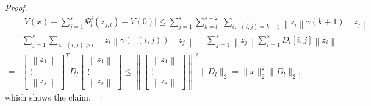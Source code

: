 \documentclass[10pt,a4paper]{amsart}
\DeclareMathOperator{\distG}{\operatorname{dist_\mathcal{G}}} %
\newcommand{\norm}[1]{\left\lVert {#1} \right\rVert}
\begin{document}
\begin{proof}
    \begin{align*}
         & \Bigg| {V(x) - \sum_{j=1}^s \Psi_l^j(z_{j,l}) - V(0)} \Bigg|  \leq \sum_{j=1}^s \sum_{k = l}^{s-2} \; \sum_{i: \distG(i,j) = k+1} \norm{z_i} \gamma(k+1) \norm{z_j} \\ 
         = &  \sum_{j=1}^s \sum_{i: \distG(i,j) > l} \norm{z_i} \gamma(\distG(i,j)) \norm{z_j}
         =  \sum_{j=1}^s \norm{z_j} \sum_{i = 1}^s D_l[i,j] \norm{z_i} \\
         = & \begin{bmatrix}
            \norm{z_1} \\
            \vdots \\
            \norm{z_s}
            \end{bmatrix}^T D_l \begin{bmatrix}
            \norm{z_1} \\
            \vdots \\
            \norm{z_s}
            \end{bmatrix} \leq  
             \norm{\begin{bmatrix}
            \norm{z_1} \\
            \vdots \\
            \norm{z_s}
            \end{bmatrix}}^2 \lVert D_l \rVert_2 = \lVert x \rVert_2^2 \lVert D_l \rVert_2,  
    \end{align*}
    which shows the claim. 
\end{proof}
\end{document}
